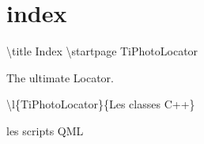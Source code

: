 \chapter{index}
\hypertarget{index}{}\label{index}
\textbackslash{}title Index \textbackslash{}startpage Ti\+Photo\+Locator

The ultimate  Locator. \begin{DoxyItemize}
\item \textbackslash{}l\{Ti\+Photo\+Locator\}\{Les classes C++\} \item les scripts QML \end{DoxyItemize}
